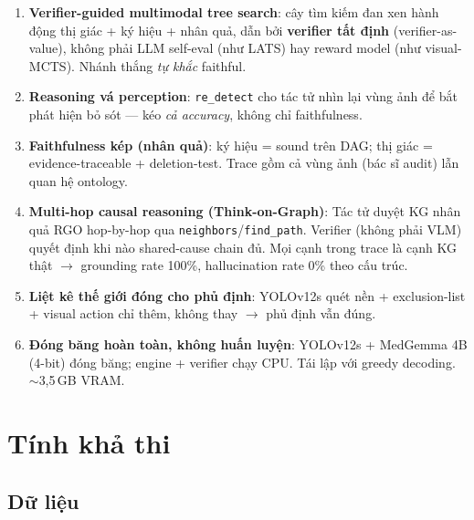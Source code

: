 \documentclass[11pt,a4paper]{article}
\begin{document}
\begin{enumerate}[leftmargin=1.5em]
  \item \textbf{Verifier-guided multimodal tree search}: cây tìm kiếm đan xen hành động thị giác + ký hiệu + nhân quả, dẫn bởi \textbf{verifier tất định} (verifier-as-value), không phải LLM self-eval (như LATS) hay reward model (như visual-MCTS). Nhánh thắng \emph{tự khắc} faithful.
  \item \textbf{Reasoning vá perception}: \texttt{re\_detect} cho tác tử nhìn lại vùng ảnh để bắt phát hiện bỏ sót --- kéo \emph{cả accuracy}, không chỉ faithfulness.
  \item \textbf{Faithfulness kép (nhân quả)}: ký hiệu = sound trên DAG; thị giác = evidence-traceable + deletion-test. Trace gồm cả vùng ảnh (bác sĩ audit) lẫn quan hệ ontology.
  \item \textbf{Multi-hop causal reasoning (Think-on-Graph)}: Tác tử duyệt KG nhân quả RGO hop-by-hop qua \texttt{neighbors}/\texttt{find\_path}. Verifier (không phải VLM) quyết định khi nào shared-cause chain đủ. Mọi cạnh trong trace là cạnh KG thật $\to$ grounding rate 100\%, hallucination rate 0\% theo cấu trúc.
  \item \textbf{Liệt kê thế giới đóng cho phủ định}: YOLOv12s quét nền + exclusion-list + visual action chỉ thêm, không thay $\to$ phủ định vẫn đúng.
  \item \textbf{Đóng băng hoàn toàn, không huấn luyện}: YOLOv12s + MedGemma 4B (4-bit) đóng băng; engine + verifier chạy CPU. Tái lập với greedy decoding. $\sim$3,5\,GB VRAM.
\end{enumerate}

\section{Tính khả thi}

\subsection{Dữ liệu}
\end{document}
